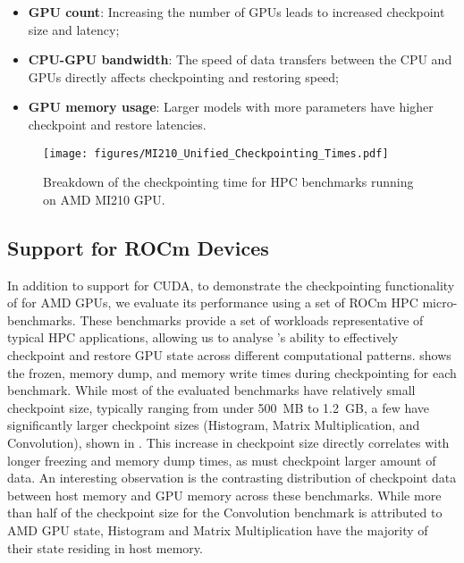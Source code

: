 \begin{itemize}
    \item \textbf{GPU count}: Increasing the number of GPUs leads to increased checkpoint size and latency;
    \item \textbf{CPU-GPU bandwidth}: The speed of data transfers between the CPU and GPUs directly affects checkpointing and restoring speed;
    \item \textbf{GPU memory usage}: Larger models with more parameters have higher checkpoint and restore latencies.
\end{itemize}

\begin{figure}[t]
  \centering
  \texttt{[image: figures/MI210\_Unified\_Checkpointing\_Times.pdf]}
  \vspace{-2.5em}
  \caption{Breakdown of the \sys checkpointing time for HPC benchmarks running on AMD MI210 GPU.}
  \label{fig:amd-gpu-checkpointing}
  \vspace{-.5em}
\end{figure}

\subsection{\sys Support for ROCm Devices}
\label{sec:eval:rocm}

In addition to support for CUDA, to demonstrate the checkpointing functionality of \sys for AMD GPUs, we evaluate its performance using a set of ROCm HPC micro-benchmarks. These benchmarks provide a set of workloads representative of typical HPC applications, allowing us to analyse \sys's ability to effectively checkpoint and restore GPU state across different computational patterns.  shows the frozen, memory dump, and memory write times during checkpointing for each benchmark. While most of the evaluated benchmarks have relatively small checkpoint size, typically ranging from under 500~MB to 1.2~GB, a few have significantly larger checkpoint sizes (Histogram, Matrix Multiplication, and Convolution), shown in . This increase in checkpoint size directly correlates with longer freezing and memory dump times, as \sys must checkpoint larger amount of data. An interesting observation is the contrasting distribution of checkpoint data between host memory and GPU memory across these benchmarks. While more than half of the checkpoint size for the Convolution benchmark is attributed to AMD GPU state, Histogram and Matrix Multiplication have the majority of their state residing in host memory.
